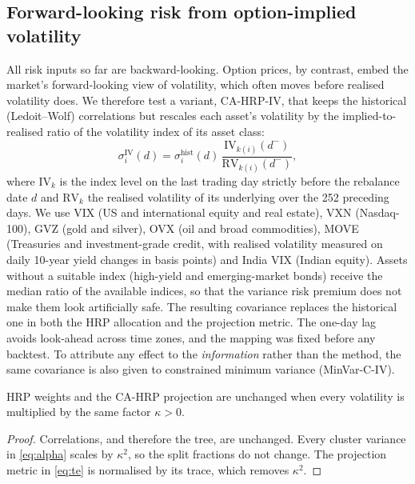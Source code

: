 \subsection{Forward-looking risk from option-implied volatility}\label{sec:iv}
All risk inputs so far are backward-looking. Option prices, by contrast, embed the market's
forward-looking view of volatility, which often moves before realised volatility does. We
therefore test a variant, CA-HRP-IV, that keeps the historical (Ledoit--Wolf) correlations
but rescales each asset's volatility by the implied-to-realised ratio of the volatility index
of its asset class:
\begin{equation}\label{eq:iv}
\sigma_i^{\mathrm{IV}}(d)=\sigma_i^{\mathrm{hist}}(d)\,\frac{\mathrm{IV}_{k(i)}(d^-)}{\mathrm{RV}_{k(i)}(d^-)},
\end{equation}
where $\mathrm{IV}_k$ is the index level on the last trading day strictly before the
rebalance date $d$ and $\mathrm{RV}_k$ the realised volatility of its underlying over the 252
preceding days. We use VIX (US and international equity and real estate), VXN (Nasdaq-100),
GVZ (gold and silver), OVX (oil and broad commodities), MOVE (Treasuries and investment-grade
credit, with realised volatility measured on daily 10-year yield changes in basis points) and
India VIX (Indian equity). Assets without a suitable index (high-yield and emerging-market
bonds) receive the median ratio of the available indices, so that the variance risk premium
does not make them look artificially safe. The resulting covariance replaces the historical
one in both the HRP allocation and the projection metric. The one-day lag avoids look-ahead
across time zones, and the mapping was fixed before any backtest. To attribute any effect to
the \emph{information} rather than the method, the same covariance is also given to
constrained minimum variance (MinVar-C-IV).

\begin{proposition}\label{prop:scale}
HRP weights and the CA-HRP projection are unchanged when every volatility is multiplied by
the same factor $\kappa>0$.
\end{proposition}
\begin{proof}
Correlations, and therefore the tree, are unchanged. Every cluster variance in
\eqref{eq:alpha} scales by $\kappa^2$, so the split fractions do not change. The projection
metric in \eqref{eq:te} is normalised by its trace, which removes $\kappa^2$.
\end{proof}


